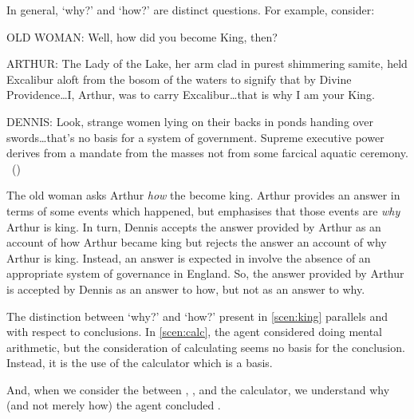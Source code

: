 \begin{note}
  In general, `why?' and `how?' are distinct questions.
  For example, consider:

  \begin{scenario}[England AD 932]
    \label{scen:king}
    \vspace{-\baselineskip}
    \begin{screenplay}
    \item[OLD WOMAN:]
      Well, how did you become King, then?
    \item[ARTHUR:]
      The Lady of the Lake, her arm clad in purest shimmering samite, held Excalibur aloft from the bosom of the waters to signify that by Divine Providence\space\dots\space I, Arthur, was to carry Excalibur\dots\space that is why I am your King.
    \item[DENNIS:]
      Look, strange women lying on their backs in ponds handing over swords\space\dots\space that's no basis for a system of government.
      Supreme executive power derives from a mandate from the masses not from some farcical aquatic ceremony.\newline
      \mbox{ }\hfill\mbox{(\cite[8--9]{Cleese:1974aa})}
    \end{screenplay}
    \vspace{-\baselineskip}
  \end{scenario}

  The old woman asks Arthur \emph{how} the become king.
  Arthur provides an answer in terms of some events which happened, but emphasises that those events are \emph{why} Arthur is king.
  In turn, Dennis accepts the answer provided by Arthur as an account of how Arthur became king but rejects the answer an account of why Arthur is king.
  Instead, an answer is expected in involve the absence of an appropriate system of governance in England.
  So, the answer provided by Arthur is accepted by Dennis as an answer to how, but not as an answer to why.

  The distinction between `why?' and `how?' present in \autoref{scen:king} parallels \qWhy{} and \qHow{} with respect to conclusions.
  In \autoref{scen:calc}, the agent considered doing mental arithmetic, but the consideration of calculating \gistCalcEq{} seems no basis for the conclusion.
  Instead, it is the use of the calculator which is a basis.

  And, when we consider the \ros{} between \propM{\gistCalcEq{}}, , and the calculator, we understand why (and not merely how) the agent concluded \gistCalcEq{}.
\end{note}

